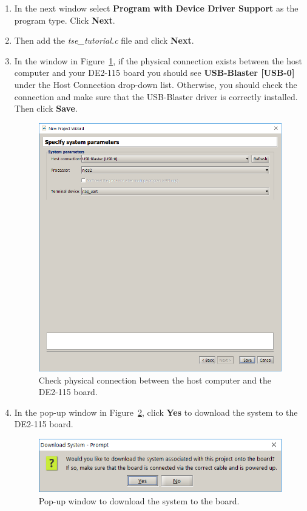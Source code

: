 \documentclass[11pt, twoside, pdftex]{article}
\begin{document}
\begin{enumerate}
	\item In the next window select {\bf Program with Device Driver Support} as the program type. Click {\bf Next}.
	
	\item Then add the {\it tse\_tutorial.c} file and click {\bf Next}.
	
	\item In the window in Figure~\ref{fig:monitor_figure2}, if the physical connection exists between the host computer and your DE2-115 board you should see {\bf USB-Blaster [USB-0]} under the {Host Connection} drop-down list. Otherwise, you should check the connection and make sure that the USB-Blaster driver is correctly installed. Then click {\bf Save}.

	\begin{figure}[H]
		\centering
		  \includegraphics[scale=0.7]{figures/monitor_figure2.png}
		\caption{Check physical connection between the host computer and the DE2-115 board.} 
		\label{fig:monitor_figure2}
	\end{figure}
		
	\item In the pop-up window in Figure~\ref{fig:monitor_figure3}, click {\bf Yes} to download the system to the DE2-115 board.

	\begin{figure}[H]
		\centering
		  \includegraphics[scale=0.7]{figures/monitor_figure3.png}
		\caption{Pop-up window to download the system to the board.} 
		\label{fig:monitor_figure3}
	\end{figure}
	

\end{enumerate}
\end{document}
